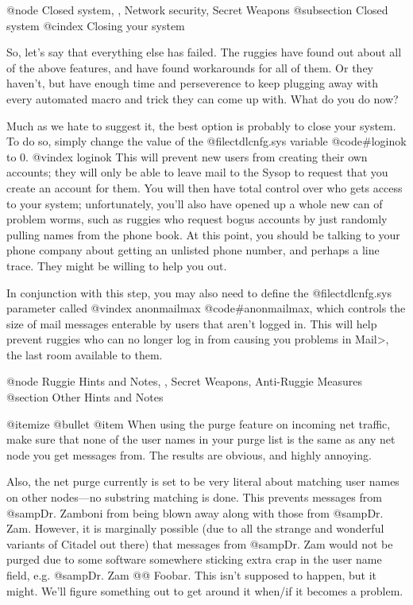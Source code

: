 @node Closed system, , Network security, Secret Weapons
@subsection Closed system
@cindex Closing your system

So, let's say that everything else has failed.
The ruggies have found out about all of the above
features, and have found workarounds for all of them.  Or
they haven't, but have enough time and perseverence to keep
plugging away with every automated macro and trick they
can come up with.  What do you do now?

Much as we hate to suggest it, the best option is
probably to close your system.  To do so, simply change
the value of the @file{ctdlcnfg.sys} variable @code{#loginok} to {0}.
@vindex loginok
This will prevent new users from creating their own
accounts; they will only be able to leave mail to the
Sysop to request that you create an account for them.  You
will then have total control over who gets access to your
system; unfortunately, you'll also have opened up a whole
new can of problem worms, such as ruggies who request bogus
accounts by just randomly pulling names from the phone book.
At this point, you should be talking to your
phone company about getting an unlisted phone number, and
perhaps a line trace.  They might be willing to help you out.

In conjunction with this step, you may also need to define the
@file{ctdlcnfg.sys} parameter called
@vindex anonmailmax
@code{#anonmailmax}, which controls the size of mail messages
enterable by users that aren't logged in.  This will help prevent
ruggies who can no longer log in from causing you problems in
Mail>, the last room available to them.

@node Ruggie Hints and Notes, , Secret Weapons, Anti-Ruggie Measures
@section Other Hints and Notes

@itemize @bullet
@item
When using the purge feature on incoming net traffic, make sure
that none of the user names in your purge list is the same as
any net node you get messages from.  The results are obvious,
and highly annoying.

Also, the net purge currently is set to be very literal about
matching user names on other nodes---no substring matching
is done.  This prevents messages from @samp{Dr. Zamboni} from being
blown away along with those from @samp{Dr. Zam}.  However, it is
marginally possible (due to all the strange and wonderful
variants of Citadel out there) that messages from @samp{Dr. Zam}
would not be purged due to some software somewhere sticking
extra crap in the user name field, e.g. @samp{Dr. Zam @@ Foobar}.
This isn't supposed to happen, but it might.  We'll figure
something out to get around it when/if it becomes a problem.


